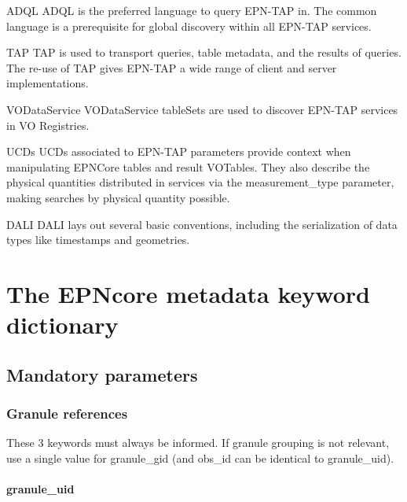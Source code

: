 \documentclass[11pt,a4paper]{ivoa}
\begin{document}
\begin{bigdescription}
\item[ADQL \citep{2008ivoa.spec.1030O}] ADQL is the preferred language to
query EPN-TAP in.  The common language is a prerequisite for global
discovery within all EPN-TAP services.
\item[TAP \citep{2019ivoa.spec.0927D}] TAP is used to transport queries,
table metadata, and the results of queries.  The re-use of TAP gives
EPN-TAP a wide range of client and server implementations.
\item[VODataService \citep{2010ivoa.spec.1202P}] VODataService tableSets
are used to discover EPN-TAP services in VO Registries.
\item[UCDs \citep{2018ivoa.spec.0527P}] UCDs associated to EPN-TAP
parameters provide context when manipulating EPNCore tables and result
VOTables. They also describe the physical quantities distributed in
services via the measurement\_type parameter, making searches by physical
quantity possible.
\item[DALI \citep{2017ivoa.spec.0517D}] DALI lays out several basic
conventions, including the serialization of data types like timestamps
and geometries.
\end{bigdescription}

\section{The EPNcore metadata keyword dictionary}

\subsection{Mandatory parameters}

\subsubsection{Granule references}

These 3 keywords must always be informed. If granule grouping is not
relevant, use a single value for granule\_gid (and obs\_id can be
identical to granule\_uid).

\paragraph{granule\_uid}
\end{document}
